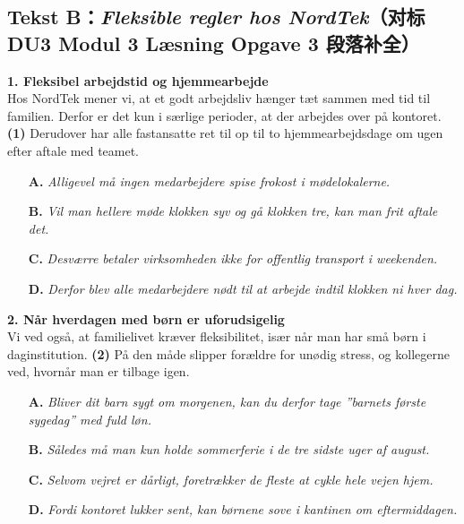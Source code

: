 \subsection*{Tekst B：\textit{Fleksible regler hos NordTek}（对标 DU3 Modul 3 Læsning Opgave 3 段落补全）}

\begin{tcolorbox}[enhanced, breakable, colback=NCDBgBlue, colframe=NCDNavy, coltitle=white, fonttitle=\bfseries, title={企业员工手册节选（阅读两段短文，各自从 A--D 中选出 1 句最契合上下文的句子）}, arc=2pt, boxrule=0.8pt, left=10pt, right=10pt, top=7pt, bottom=7pt]
\small
\textbf{1. Fleksibel arbejdstid og hjemmearbejde}\\
Hos NordTek mener vi, at et godt arbejdsliv hænger tæt sammen med tid til familien. Derfor er det kun i særlige perioder, at der arbejdes over på kontoret. \textbf{(1)} \underline{\hspace{4.5cm}} Derudover har alle fastansatte ret til op til to hjemmearbejdsdage om ugen efter aftale med teamet.

\begin{itemize}
  \item[\textbf{A.}] \textit{Alligevel må ingen medarbejdere spise frokost i mødelokalerne.}
  \item[\textbf{B.}] \textit{Vil man hellere møde klokken syv og gå klokken tre, kan man frit aftale det.}
  \item[\textbf{C.}] \textit{Desværre betaler virksomheden ikke for offentlig transport i weekenden.}
  \item[\textbf{D.}] \textit{Derfor blev alle medarbejdere nødt til at arbejde indtil klokken ni hver dag.}
\end{itemize}

\vspace{0.3em}
\textbf{2. Når hverdagen med børn er uforudsigelig}\\
Vi ved også, at familielivet kræver fleksibilitet, især når man har små børn i daginstitution. \textbf{(2)} \underline{\hspace{4.5cm}} På den måde slipper forældre for unødig stress, og kollegerne ved, hvornår man er tilbage igen.

\begin{itemize}
  \item[\textbf{A.}] \textit{Bliver dit barn sygt om morgenen, kan du derfor tage ”barnets første sygedag” med fuld løn.}
  \item[\textbf{B.}] \textit{Således må man kun holde sommerferie i de tre sidste uger af august.}
  \item[\textbf{C.}] \textit{Selvom vejret er dårligt, foretrækker de fleste at cykle hele vejen hjem.}
  \item[\textbf{D.}] \textit{Fordi kontoret lukker sent, kan børnene sove i kantinen om eftermiddagen.}
\end{itemize}
\end{tcolorbox}

